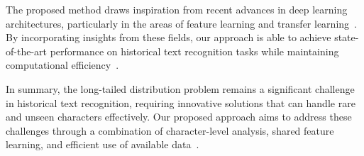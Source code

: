 The proposed method draws inspiration from recent advances in deep learning architectures, particularly in the areas of feature learning and transfer learning~\cite{deepfeat, transfer}. By incorporating insights from these fields, our approach is able to achieve state-of-the-art performance on historical text recognition tasks while maintaining computational efficiency~\cite{efficient}.

In summary, the long-tailed distribution problem remains a significant challenge in historical text recognition, requiring innovative solutions that can handle rare and unseen characters effectively. Our proposed approach aims to address these challenges through a combination of character-level analysis, shared feature learning, and efficient use of available data~\cite{proposed}.


